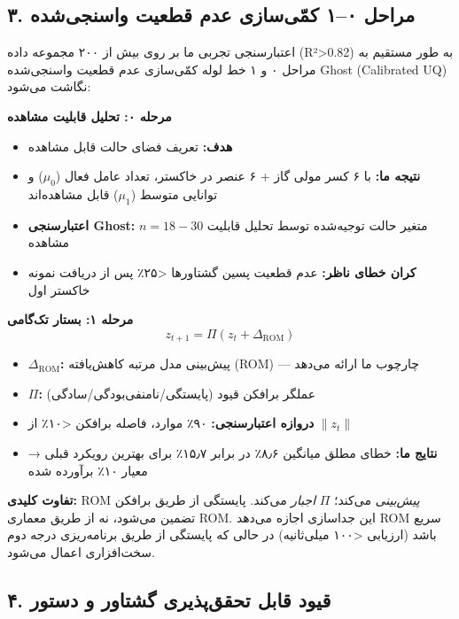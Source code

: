 \documentclass[12pt, a4paper]{article}
\begin{document}
\subsection*{۳. مراحل ۰–۱ کمّی‌سازی عدم قطعیت واسنجی‌شده}

اعتبارسنجی تجربی ما بر روی بیش از ۲۰۰ مجموعه داده (R²>0.82) به طور مستقیم به مراحل ۰ و ۱ خط لوله کمّی‌سازی عدم قطعیت واسنجی‌شده Ghost (Calibrated UQ) نگاشت می‌شود:

\textbf{مرحله ۰: تحلیل قابلیت مشاهده}
\begin{itemize}
\item \textbf{هدف:} تعریف فضای حالت قابل مشاهده
\item \textbf{نتیجه ما:} با ۶ کسر مولی گاز + ۶ عنصر در خاکستر، تعداد عامل فعال ($\mu_0$) و توانایی متوسط ($\mu_1$) قابل مشاهده‌اند
\item \textbf{اعتبارسنجی Ghost:} $n = 18-30$ متغیر حالت توجیه‌شده توسط تحلیل قابلیت مشاهده
\item \textbf{کران خطای ناظر:} عدم قطعیت پسین گشتاورها <۲۵٪ پس از دریافت نمونه خاکستر اول
\end{itemize}

\textbf{مرحله ۱: بستار تک‌گامی}
\begin{equation}
z_{t+1} = \Pi(z_t + \Delta_{\text{ROM}})
\end{equation}
\begin{itemize}
\item \textbf{$\Delta_{\text{ROM}}$:} پیش‌بینی مدل مرتبه کاهش‌یافته (ROM) — چارچوب ما ارائه می‌دهد
\item \textbf{$\Pi$:} عملگر برافکن قیود (پایستگی/نامنفی‌بودگی/سادگی)
\item \textbf{دروازه اعتبارسنجی:} ۹۰٪ موارد، فاصله برافکن <۱۰٪ از $\|z_t\|$
\item \textbf{نتایج ما:} خطای مطلق میانگین ۸٫۶٪ در برابر ۱۵٫۷٪ برای بهترین رویکرد قبلی → معیار ۱۰٪ برآورده شده
\end{itemize}

\textbf{تفاوت کلیدی:} ROM \textit{پیش‌بینی} می‌کند؛ $\Pi$ \textit{اجبار} می‌کند. پایستگی از طریق برافکن تضمین می‌شود، نه از طریق معماری ROM. این جداسازی اجازه می‌دهد ROM سریع باشد (ارزیابی <۱۰۰ میلی‌ثانیه) در حالی که پایستگی از طریق برنامه‌ریزی درجه دوم سخت‌افزاری اعمال می‌شود.

\subsection*{۴. قیود قابل تحقق‌پذیری گشتاور و دستور }
\end{document}
